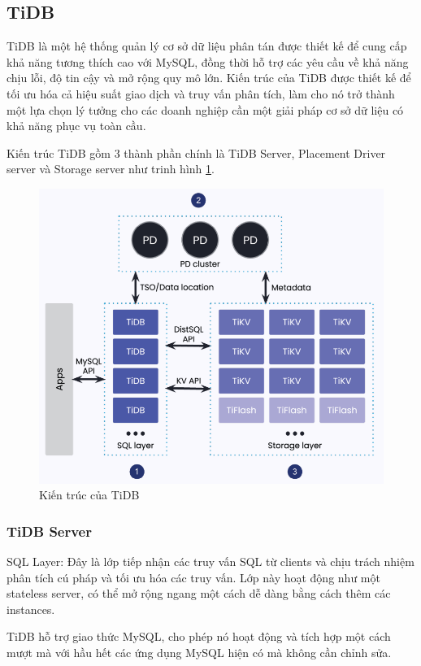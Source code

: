 \documentclass{extreport}[13.5pt, oneside,a4paper]
\begin{document}
\subsection{TiDB}

TiDB \cite{huang2020tidb} là một hệ thống quản lý cơ sở dữ liệu phân tán được thiết kế để cung cấp khả năng tương thích cao với MySQL, đồng thời hỗ trợ các yêu cầu về khả năng chịu lỗi, độ tin cậy và mở rộng quy mô lớn. Kiến trúc của TiDB được thiết kế để tối ưu hóa cả hiệu suất giao dịch và truy vấn phân tích, làm cho nó trở thành một lựa chọn lý tưởng cho các doanh nghiệp cần một giải pháp cơ sở dữ liệu có khả năng phục vụ toàn cầu.

Kiến trúc TiDB gồm 3 thành phần chính là TiDB Server, Placement Driver server và Storage server như trinh hình \ref{fig:TiDBArchiteture}.


\begin{figure}
    \centering
    \includegraphics[width=0.6\linewidth]{TiDBArchiteture.png}
    \caption{Kiến trúc của TiDB\protect\footnotemark}
    \label{fig:TiDBArchiteture}
\end{figure}




\subsubsection{TiDB Server}

SQL Layer: Đây là lớp tiếp nhận các truy vấn SQL từ clients và chịu trách nhiệm phân tích cú pháp và tối ưu hóa các truy vấn. Lớp này hoạt động như một stateless server, có thể mở rộng ngang một cách dễ dàng bằng cách thêm các instances.

TiDB hỗ trợ giao thức MySQL, cho phép nó hoạt động và tích hợp một cách mượt mà với hầu hết các ứng dụng MySQL hiện có mà không cần chỉnh sửa.
\end{document}
